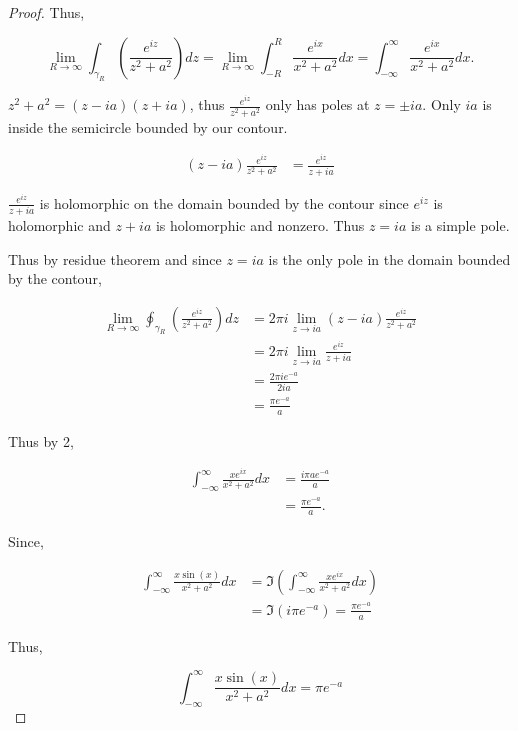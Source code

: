 \documentclass{article}
\newcommand*{\lm}[1]{\lim_{#1 \to \infty}}
\begin{document}
\begin{proof}
    Thus, 

    \begin{equation*}
        \lm{R} \int_{\gamma_R} \left(\frac{e^{iz}}{z^2 + a^2}\right) dz 
        = \lm{R} \int_{-R}^{R} \frac{e^{ix}}{x^2 + a^2} dx = \int_{-\infty}^{\infty} \frac{e^{ix}}{x^2 + a^2} dx.
    \end{equation*}

    $z^2 + a^2 = (z - ia)(z + ia)$, thus $\frac{e^{iz}}{z^2 + a^2}$ only has poles at $z = \pm ia$. Only $ia$ is inside the semicircle bounded by our contour. 
    
    \begin{align*}
        (z - ia)\frac{e^{iz}}{z^2 + a^2} &= \frac{e^{iz}}{z + ia}
    \end{align*}

    $\frac{e^{iz}}{z + ia}$ is holomorphic on the domain bounded by the contour since $e^{iz}$ is holomorphic and $z + ia$ is holomorphic and nonzero. Thus $z = ia$ is a simple pole. 
    
    
    Thus by residue theorem and since $z = ia$ is the only pole in the domain bounded by the contour, 

    \begin{align*}
        \lm{R} \oint_{\gamma_R} \left(\frac{e^{iz}}{z^2 + a^2}\right) dz 
        &= 2 \pi i \lim_{z \to ia} (z - ia) \frac{e^{iz}}{z^2 + a^2} \\
        &= 2 \pi i \lim_{z \to ia} \frac{e^{iz}}{z + ia} \\
        &= \frac{2 \pi i e^{-a}}{2ia} \\
        &= \frac{\pi e^{-a}}{a}
    \end{align*}

    Thus by 2, 

    \begin{align*}
        \int_{-\infty}^{\infty} \frac{x e^{ix}}{x^2 + a^2} dx &= \frac{i\pi a e^{-a}}{a} \\
        &= \frac{\pi e^{-a}}{a}.
    \end{align*}

    Since, 

    \begin{align*}
        \int_{-\infty}^{\infty} \frac{x \sin(x)}{x^2 + a^2} dx &= \Im{\left(\int_{-\infty}^{\infty} \frac{x e^{ix}}{x^2 + a^2}dx\right)} \\
        &= \Im{(i\pi e^{-a})} = \frac{\pi e^{-a}}{a}
    \end{align*}

    Thus, 

    \begin{equation*}
        \int_{-\infty}^{\infty} \frac{x \sin(x)}{x^2 + a^2} dx = \pi e^{-a}
    \end{equation*}
\end{proof}
\end{document}
